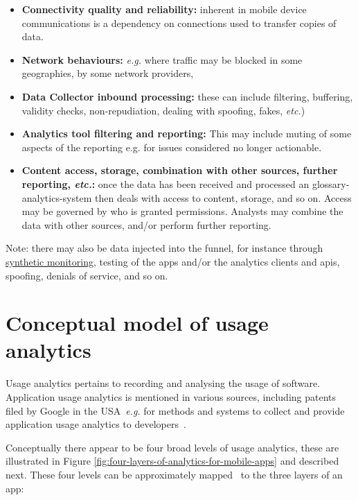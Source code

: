 \begin{itemize}
    \item \textbf{Connectivity quality and reliability:} inherent in mobile device communications is a dependency on connections used to transfer copies of data. 
    \item \textbf{Network behaviours:} \emph{e.g.} where traffic may be blocked in some geographies, by some network providers, %
    \item \textbf{Data Collector inbound processing:} these can include filtering, buffering, validity checks, non-repudiation, dealing with spoofing, fakes, \emph{etc.})
    \item \textbf{Analytics tool filtering and reporting:} This may include muting of some aspects of the reporting e.g. for issues considered no longer actionable. 
    \item \textbf{Content access, storage, combination with other sources, further reporting, \emph{etc.}:} once the data has been received and processed an \gls{glossary-analytics-system} then deals with access to content, storage, and so on. Access may be governed by who is granted permissions. Analysts may combine the data with other sources, and/or perform further reporting.
\end{itemize}

Note: there may also be data injected into the funnel, for instance through \href{https://en.wikipedia.org/wiki/Synthetic_monitoring}{synthetic monitoring}, testing of the apps and/or the analytics clients and \Glspl{api}, spoofing, denials of service, and so on. 


\section{Conceptual model of usage analytics}
Usage analytics pertains to recording and analysing the usage of software. Application usage analytics is mentioned in various sources, including patents filed by Google in the USA~\emph{e.g.} for methods and systems to collect and provide application usage analytics to developers~. 

Conceptually there appear to be four broad levels of usage analytics, these are illustrated in Figure \ref{fig:four-layers-of-analytics-for-mobile-apps} and described next. These four levels can be approximately mapped~ to the three layers of an app:

